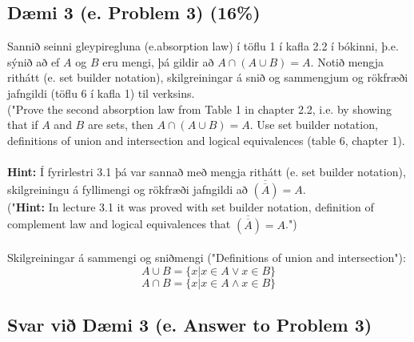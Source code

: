 \subsection*{Dæmi 3 (e. Problem 3) (16\%)\label{section:daemi3}}
Sannið seinni gleypiregluna (e.absorption law) í töflu 1 í kafla 2.2 í bókinni, þ.e. sýnið að ef $A$ og $B$ eru mengi, þá gildir að $A \cap (A \cup B) = A$. Notið mengja rithátt (e. set builder notation), skilgreiningar á snið og sammengjum\textasteriskcentered \hspace{0.5mm} og rökfræði jafngildi (töflu 6 í kafla 1) til verksins. \\
("Prove the second absorption law from Table 1 in chapter 2.2, i.e. by showing that if $A$ and $B$ are sets, then
$A \cap (A \cup B) = A$. Use set builder notation, definitions of union and intersection\textasteriskcentered \hspace{0.5mm}  and logical equivalences (table 6, chapter 1). \\ \\
\footnotesize
\textbf{Hint:} Í fyrirlestri 3.1 þá var sannað með mengja rithátt (e. set builder notation), skilgreiningu á fyllimengi og rökfræði jafngildi að $\overline{(\overline{A})} =A$. \\ 
("\textbf{Hint:} In lecture 3.1 it was proved with set builder notation, definition of complement law and logical equivalences that $\overline{(\overline{A})} =A$.")
\\ \\
\textasteriskcentered Skilgreiningar á sammengi og sniðmengi ("Definitions of union and intersection"):
$$A \cup B = \{x| x \in A \lor x \in B\}$$
$$A \cap B = \{x| x \in A \land x \in B\}$$
\normalsize

\subsection*{Svar við Dæmi 3 (e. Answer to Problem 3)}

\newcommand{\makeAnswerBoxProblemThree}{
  \noindent
  \begin{tcolorbox}[colframe=black, colback=white, boxrule=0.5pt, arc=0pt, outer arc=0pt, height=\dimexpr\textheight-\ht\strutbox-18\baselineskip\relax]

    
  \end{tcolorbox}
}

\makeAnswerBoxProblemThree 




